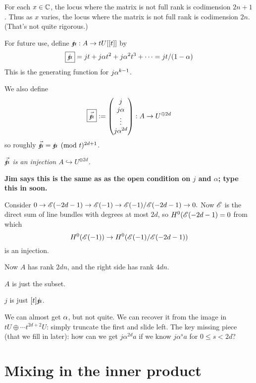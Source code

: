 {For each $x \in \mathbb{C}$, the locus where the matrix is not full rank is codimension $2n+1$.
Thus as $x$ varies, the locus where the matrix is not full rank is codimension $\boxed{\boxed{2n}}$.
(That's not quite rigorous.)


For future use, define $\mathord{j\mkern-7mu\alpha}: A \rightarrow t U[[t]]$ by
$$\boxed{\mathord{j\mkern-7mu\alpha}} = j t + j \alpha  t^2 + j \alpha^2  t^3 + \cdots = jt/(1-\alpha)$$
This is the generating function for $j \alpha^{k-1}$.

We also define
$$
\boxed{\vec{\mathord{j\mkern-7mu\alpha}}} :=
\begin{pmatrix}
j \\
  j \alpha \\
  \vdots \\
j \alpha^{2d}
\end{pmatrix} : A \rightarrow U^{\oplus 2d}
$$
so roughly $\vec{\mathord{j\mkern-7mu\alpha}} = 
\mathord{j\mkern-7mu\alpha} \pmod t^{2d+1}$.

   {\em $\vec{\mathord{j\mkern-7mu\alpha}}$ is an injection $A \hookrightarrow U^{\oplus 2d}$.
}

{\bf Jim says this is the same as as the open condition on $j$ and $\alpha$; type this in soon.}


Consider $0 \rightarrow {\mathscr{E}}(-2d-1) \rightarrow {\mathscr{E}}(-1) \rightarrow {\mathscr{E}}(-1)/{\mathscr{E}}(-2d-1) \rightarrow 0.$
Now ${\mathscr{E}}$ is the direct sum of line bundles with degrees at most $2d$,
so $H^0({\mathscr{E}}(-2d-1)=0$ from which
$$
H^0({\mathscr{E}}(-1)) \rightarrow H^0({\mathscr{E}}(-1)/ {\mathscr{E}}(-2d-1))$$ is an  injection. \epf

Now $A$ has rank $2dn$, and  the right side has rank $4dn$.


$A$ is just the subset.

$j$ is just $[t] \mathord{j\mkern-7mu\alpha}$.

We can almost get $\alpha$, but not quite. We can recover it from the image in
$tU \oplus \cdots t^{2d+2}U$:  simply truncate the first and slide left.
The key missing piece (that we fill in later):  how can we get $j \alpha^{2d} a$ if we know $j \alpha^s a$ for $0 \leq s < 2d$?


\section{Mixing in the inner product}

}
